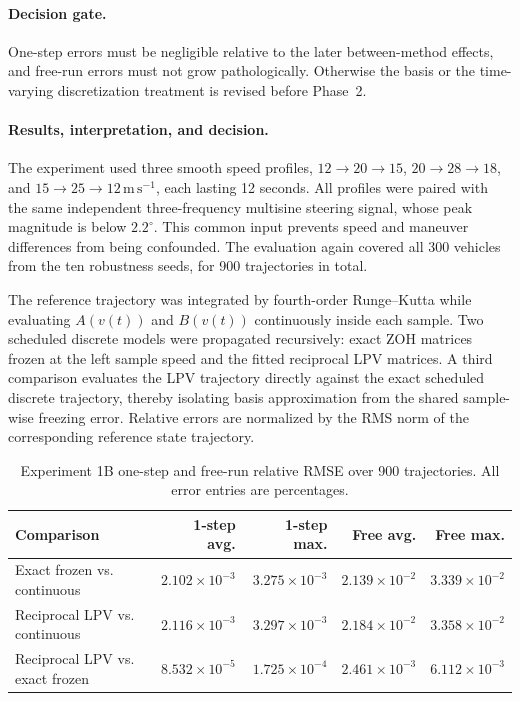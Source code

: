 \paragraph{Decision gate.}
One-step errors must be negligible relative to the later between-method effects,
and free-run errors must not grow pathologically. Otherwise the basis or the
time-varying discretization treatment is revised before Phase~2.

\paragraph{Results, interpretation, and decision.}
The experiment used three smooth speed profiles,
$12\rightarrow20\rightarrow15$, $20\rightarrow28\rightarrow18$, and
$15\rightarrow25\rightarrow12\,\mathrm{m\,s^{-1}}$, each lasting 12 seconds.
All profiles were paired with the same independent three-frequency multisine
steering signal, whose peak magnitude is below $2.2^\circ$.  This common input
prevents speed and maneuver differences from being confounded.  The evaluation
again covered all 300 vehicles from the ten robustness seeds, for 900
trajectories in total.

The reference trajectory was integrated by fourth-order Runge--Kutta while
evaluating $A(v(t))$ and $B(v(t))$ continuously inside each sample.  Two
scheduled discrete models were propagated recursively: exact ZOH matrices
frozen at the left sample speed and the fitted reciprocal LPV matrices.  A third
comparison evaluates the LPV trajectory directly against the exact scheduled
discrete trajectory, thereby isolating basis approximation from the shared
sample-wise freezing error.  Relative errors are normalized by the RMS norm of
the corresponding reference state trajectory.

\begin{table}[htbp]
 \centering
 \caption{Experiment 1B one-step and free-run relative RMSE over 900
 trajectories. All error entries are percentages.}
 \label{tab:experiment-1b}
 \begin{tabular}{lrrrr}
  \toprule
  Comparison & 1-step avg. & 1-step max. & Free avg. & Free max. \\
  \midrule
  Exact frozen vs. continuous & $2.102\!\times\!10^{-3}$ & $3.275\!\times\!10^{-3}$ & $2.139\!\times\!10^{-2}$ & $3.339\!\times\!10^{-2}$ \\
  Reciprocal LPV vs. continuous & $2.116\!\times\!10^{-3}$ & $3.297\!\times\!10^{-3}$ & $2.184\!\times\!10^{-2}$ & $3.358\!\times\!10^{-2}$ \\
  Reciprocal LPV vs. exact frozen & $8.532\!\times\!10^{-5}$ & $1.725\!\times\!10^{-4}$ & $2.461\!\times\!10^{-3}$ & $6.112\!\times\!10^{-3}$ \\
  \bottomrule
 \end{tabular}
\end{table}

